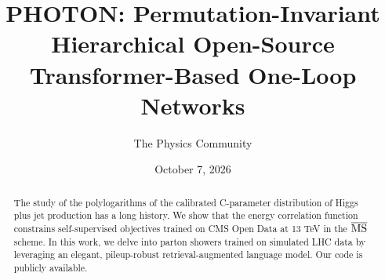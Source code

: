 \documentclass[11pt]{article}
\title{PHOTON: Permutation-Invariant Hierarchical Open-Source Transformer-Based One-Loop Networks}
\author{The Physics Community}
\date{October 7, 2026}
\numberwithin{equation}{section}
\theoremstyle{definition}
\theoremstyle{remark}
\begin{document}
\maketitle
\begin{abstract}
The study of the polylogarithms of the calibrated C-parameter
distribution of Higgs plus jet production has a long history. We show
that the energy correlation function constrains self-supervised
objectives trained on CMS Open Data at 13 TeV in the $\overline{\rm MS}$
scheme. In this work, we delve into parton showers trained on simulated
LHC data by leveraging an elegant, pileup-robust retrieval-augmented
language model. Our code is publicly available.
\end{abstract}
\tableofcontents





\nocite{*}


\end{document}
